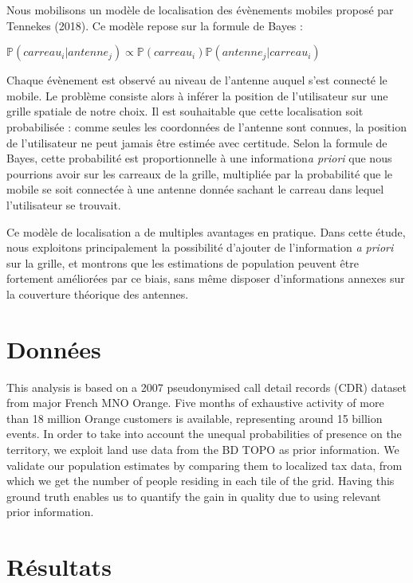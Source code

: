 \documentclass[12pt]{article}
\begin{document}
Nous mobilisons un modèle de localisation des évènements mobiles proposé par Tennekes (2018). Ce modèle repose sur la formule de Bayes :

\begin{center}
\begingroup
\large
$\mathbb{P}(carreau_i | antenne_j) \propto \mathbb{P}(carreau_i) \mathbb{P}(antenne_j | carreau_i)$
\endgroup
\end{center}

Chaque évènement est observé au niveau de l'antenne auquel s'est connecté le mobile. Le problème consiste alors à inférer la position de l'utilisateur sur une grille spatiale de notre choix. Il est souhaitable que cette localisation soit probabilisée : comme seules les coordonnées de l'antenne sont connues, la position de l'utilisateur ne peut jamais être estimée avec certitude. Selon la formule de Bayes, cette probabilité est proportionnelle à une information\textit{a priori} que nous pourrions avoir sur les carreaux de la grille, multipliée par la probabilité que le mobile se soit connectée à une antenne donnée sachant le carreau dans lequel l'utilisateur se trouvait.

Ce modèle de localisation a de multiples avantages en pratique. Dans cette étude, nous exploitons principalement la possibilité d'ajouter de l'information \textit{a priori} sur la grille, et montrons que les estimations de population peuvent être fortement améliorées par ce biais, sans même disposer d'informations annexes sur la couverture théorique des antennes.

\section{Données}

This analysis is based on a 2007 pseudonymised call detail records (CDR) dataset from major French MNO Orange. Five months of exhaustive activity of more than 18 million Orange customers is available, representing around 15 billion events. In order to take into account the unequal probabilities of presence on the territory, we exploit land use data from the BD TOPO as prior information. We validate our population estimates by comparing them to localized tax data, from which we get the number of people residing in each tile of the grid. Having this ground truth enables us to quantify the gain in quality due to using relevant prior information.

\section{Résultats}
\end{document}
